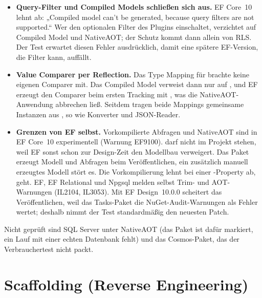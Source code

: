 \begin{itemize}
  \item \textbf{Query-Filter und Compiled Models schließen sich aus.} EF Core~10 lehnt
     ab: „Compiled model can't be generated, because query filters are not
    supported.“ Wer den optionalen Filter des Plugins einschaltet, verzichtet auf Compiled
    Model und NativeAOT; der Schutz kommt dann allein von RLS. Der Test erwartet diesen Fehler
    ausdrücklich, damit eine spätere EF-Version, die Filter kann, auffällt.
  \item \textbf{Value Comparer per Reflection.} Das Type Mapping für  brachte
    keine eigenen Comparer mit. Das Compiled Model verweist dann nur auf
    , und
    EF erzeugt den Comparer beim ersten Tracking mit ,
    was die NativeAOT-Anwendung abbrechen ließ. Seitdem tragen beide Mappings gemeinsame
    Instanzen aus , so wie
    Konverter und JSON-Reader.
  \item \textbf{Grenzen von EF selbst.} Vorkompilierte Abfragen und NativeAOT sind in EF
    Core~10 experimentell (Warnung EF9100).  darf nicht im
    Projekt stehen, weil EF sonst schon zur Design-Zeit den Modellbau verweigert. Das Paket
    erzeugt Modell und Abfragen beim Veröffentlichen, ein zusätzlich manuell erzeugtes Modell
    stört es. Die Vorkompilierung lehnt  bei einer
    -Property ab,  geht. EF, EF Relational und Npgsql melden selbst
    Trim- und AOT-Warnungen (IL2104, IL3053). Mit EF Design~10.0.0 scheitert das
    Veröffentlichen, weil das Tasks-Paket die NuGet-Audit-Warnungen als Fehler wertet; deshalb
    nimmt der Test standardmäßig den neuesten Patch.
\end{itemize}

Nicht geprüft sind SQL Server unter NativeAOT (das Paket ist dafür markiert, ein Lauf mit
einer echten Datenbank fehlt) und das Cosmos-Paket, das der Verbrauchertest nicht packt.


\chapter{Scaffolding (Reverse Engineering)}\label{ch:scaffolding-reverse-engineering}

